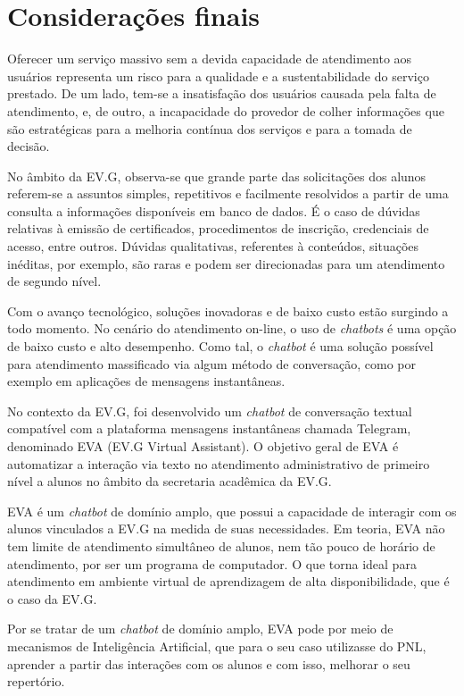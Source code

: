 \chapter{Considerações finais}

Oferecer um serviço massivo sem a devida capacidade de atendimento aos usuários representa um risco para a qualidade e a sustentabilidade do serviço prestado. De um lado, tem-se a insatisfação dos usuários causada pela falta de atendimento, e, de outro, a incapacidade do provedor de colher informações que são estratégicas para a melhoria contínua dos serviços e para a tomada de decisão.

No âmbito da EV.G, observa-se que grande parte das solicitações dos alunos referem-se a assuntos simples, repetitivos e facilmente resolvidos a partir de uma consulta a informações disponíveis em banco de dados. É o caso de dúvidas relativas à emissão de certificados, procedimentos de inscrição, credenciais de acesso, entre outros. Dúvidas qualitativas, referentes à conteúdos, situações inéditas, por exemplo, são raras e podem ser direcionadas para um atendimento de segundo nível.  

Com o avanço tecnológico, soluções inovadoras e de baixo custo estão surgindo a todo momento. No cenário do atendimento on-line, o uso de \textit{chatbots} é uma opção de baixo custo e alto desempenho. Como tal, o \textit{chatbot} é uma solução possível para atendimento massificado via algum método de conversação, como por exemplo em aplicações de mensagens instantâneas.

No contexto da EV.G, foi desenvolvido um \textit{chatbot} de conversação textual compatível com a plataforma mensagens instantâneas chamada Telegram, denominado EVA (EV.G Virtual Assistant). O objetivo geral de EVA é automatizar a interação via texto no atendimento administrativo de primeiro nível a alunos no âmbito da secretaria acadêmica da EV.G.

EVA é um \textit{chatbot} de domínio amplo, que possui a capacidade de interagir com os alunos vinculados a EV.G na medida de suas necessidades. Em teoria, EVA não tem limite de atendimento simultâneo de alunos, nem tão pouco de horário de atendimento, por ser um programa de computador. O que torna ideal para atendimento em ambiente virtual de aprendizagem de alta disponibilidade, que é o caso da EV.G.

Por se tratar de um \textit{chatbot} de domínio amplo, EVA pode por meio de mecanismos de Inteligência Artificial, que para o seu caso utilizasse do PNL, aprender a partir das interações com os alunos e com isso, melhorar o seu repertório.

